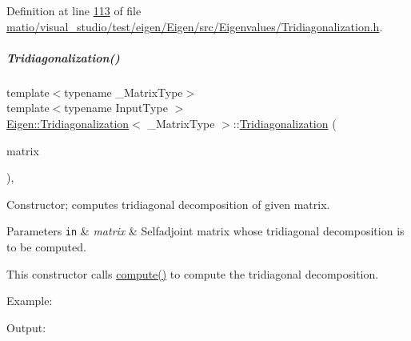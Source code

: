 Definition at line \hyperlink{matio_2visual__studio_2test_2eigen_2_eigen_2src_2_eigenvalues_2_tridiagonalization_8h_source_l00113}{113} of file \hyperlink{matio_2visual__studio_2test_2eigen_2_eigen_2src_2_eigenvalues_2_tridiagonalization_8h_source}{matio/visual\+\_\+studio/test/eigen/\+Eigen/src/\+Eigenvalues/\+Tridiagonalization.\+h}.

\mbox{\label{group___eigenvalues___module_a05406b7df9a92fdcba72d31443f67a98}} 
\subparagraph{\texorpdfstring{Tridiagonalization()}{Tridiagonalization()}\hspace{0.1cm}{\footnotesize\ttfamily [4/4]}}
{\footnotesize\ttfamily template$<$typename \+\_\+\+Matrix\+Type$>$ \\
template$<$typename Input\+Type $>$ \\
\hyperlink{group___eigenvalues___module_class_eigen_1_1_tridiagonalization}{Eigen\+::\+Tridiagonalization}$<$ \+\_\+\+Matrix\+Type $>$\+::\hyperlink{group___eigenvalues___module_class_eigen_1_1_tridiagonalization}{Tridiagonalization} (\begin{DoxyParamCaption}\item[{const \hyperlink{group___core___module_struct_eigen_1_1_eigen_base}{Eigen\+Base}$<$ Input\+Type $>$ \&}]{matrix }\end{DoxyParamCaption})\hspace{0.3cm}{\ttfamily [inline]}, {\ttfamily [explicit]}}



Constructor; computes tridiagonal decomposition of given matrix. 


\begin{DoxyParams}[1]{Parameters}
\mbox{\tt in}  & {\em matrix} & Selfadjoint matrix whose tridiagonal decomposition is to be computed.\\
\hline
\end{DoxyParams}
This constructor calls \hyperlink{group___eigenvalues___module_acd288abb081d3b40b87e4b98cd8f6ee9}{compute()} to compute the tridiagonal decomposition.

Example\+: 
\begin{DoxyCodeInclude}
\end{DoxyCodeInclude}
 Output\+: 
\begin{DoxyVerbInclude}
\end{DoxyVerbInclude}
 

